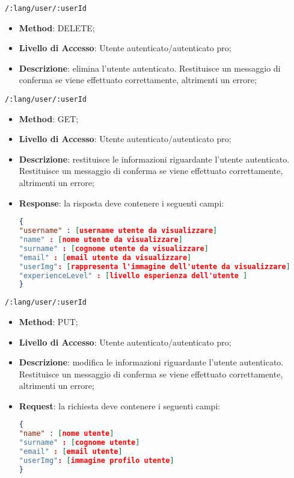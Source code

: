 \item \texttt{/:lang/user/:userId}
	\begin{itemize}
		\item \textbf{Method}: DELETE;
		\item \textbf{Livello di Accesso}: Utente autenticato/autenticato pro;
		\item \textbf{Descrizione}: elimina l'utente autenticato. Restituisce un messaggio di conferma se viene effettuato correttamente, altrimenti un errore;
	\end{itemize}	
	
	\item \texttt{/:lang/user/:userId}
		\begin{itemize}
			\item \textbf{Method}: GET;
			\item \textbf{Livello di Accesso}: Utente autenticato/autenticato pro;
			\item \textbf{Descrizione}: restituisce le informazioni riguardante l'utente autenticato. Restituisce un messaggio di conferma se viene effettuato correttamente, altrimenti un errore;
			\item \textbf{Response}: la risposta deve contenere i seguenti campi:
\begin{lstlisting}[language=json,firstnumber=1]
{
"username" : [username utente da visualizzare]
"name" : [nome utente da visualizzare]
"surname" : [cognome utente da visualizzare]
"email" : [email utente da visualizzare]
"userImg": [rappresenta l'immagine dell'utente da visualizzare]
"experienceLevel" : [livello esperienza dell'utente ]
}
\end{lstlisting}
		\end{itemize}
		
	\item \texttt{/:lang/user/:userId}
		\begin{itemize}
			\item \textbf{Method}: PUT;
			\item \textbf{Livello di Accesso}: Utente autenticato/autenticato pro;
			\item \textbf{Descrizione}: modifica le informazioni riguardante l'utente autenticato. Restituisce un messaggio di conferma se viene
effettuato correttamente, altrimenti un errore;
			\item \textbf{Request}: la richiesta deve contenere i seguenti campi:
\begin{lstlisting}[language=json,firstnumber=1]
{
"name" : [nome utente]
"surname" : [cognome utente]
"email" : [email utente]
"userImg": [immagine profilo utente]
}
\end{lstlisting}
		\end{itemize}	
		
